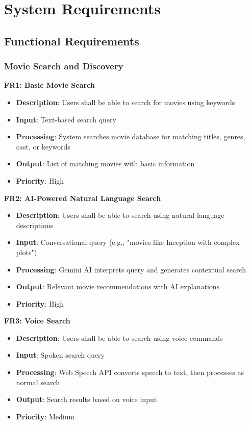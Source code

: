 \documentclass[12pt,a4paper]{article}
\begin{document}
\section{System Requirements}

\subsection{Functional Requirements}

\subsubsection{Movie Search and Discovery}

\textbf{FR1: Basic Movie Search}
\begin{itemize}
    \item \textbf{Description}: Users shall be able to search for movies using keywords
    \item \textbf{Input}: Text-based search query
    \item \textbf{Processing}: System searches movie database for matching titles, genres, cast, or keywords
    \item \textbf{Output}: List of matching movies with basic information
    \item \textbf{Priority}: High
\end{itemize}

\textbf{FR2: AI-Powered Natural Language Search}
\begin{itemize}
    \item \textbf{Description}: Users shall be able to search using natural language descriptions
    \item \textbf{Input}: Conversational query (e.g., "movies like Inception with complex plots")
    \item \textbf{Processing}: Gemini AI interprets query and generates contextual search
    \item \textbf{Output}: Relevant movie recommendations with AI explanations
    \item \textbf{Priority}: High
\end{itemize}

\textbf{FR3: Voice Search}
\begin{itemize}
    \item \textbf{Description}: Users shall be able to search using voice commands
    \item \textbf{Input}: Spoken search query
    \item \textbf{Processing}: Web Speech API converts speech to text, then processes as normal search
    \item \textbf{Output}: Search results based on voice input
    \item \textbf{Priority}: Medium
\end{itemize}
\end{document}
